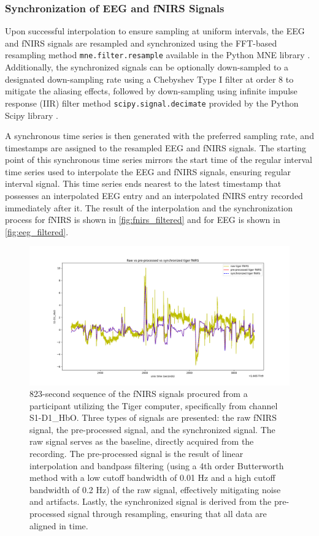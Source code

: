 \subsubsection{Synchronization of EEG and fNIRS Signals}

Upon successful interpolation to ensure sampling at uniform intervals, the EEG and fNIRS signals are resampled and synchronized using the FFT-based resampling method \texttt{mne.filter.resample} available in the Python MNE library \cite{GramfortEtAl2013a}. Additionally, the synchronized signals can be optionally down-sampled to a designated down-sampling rate using a Chebyshev Type I filter at order 8 to mitigate the aliasing effects, followed by down-sampling using infinite impulse response (IIR) filter method \texttt{scipy.signal.decimate} provided by the Python Scipy library \cite{2020SciPy-NMeth}.

A synchronous time series is then generated with the preferred sampling rate, and timestamps are assigned to the resampled EEG and fNIRS signals. The starting point of this synchronous time series mirrors the start time of the regular interval time series used to interpolate the EEG and fNIRS signals, ensuring regular interval signal. This time series ends nearest to the latest timestamp that possesses an interpolated EEG entry and an interpolated fNIRS entry recorded immediately after it. The result of the interpolation and the synchronization process for fNIRS is shown in \autoref{fig:fnirs_filtered} and for EEG is shown in \autoref{fig:eeg_filtered}.

\begin{figure}[h]
  \centering
  \includegraphics[width=\textwidth]{images/fnirs_filtered}
  \caption{823-second sequence of the fNIRS signals procured from a participant utilizing the Tiger computer, specifically from channel S1-D1\_HbO. Three types of signals are presented: the raw fNIRS signal, the pre-processed signal, and the synchronized signal. The raw signal serves as the baseline, directly acquired from the recording. The pre-processed signal is the result of linear interpolation and bandpass filtering (using a 4th order Butterworth method with a low cutoff bandwidth of 0.01 Hz and a high cutoff bandwidth of 0.2 Hz) of the raw signal, effectively mitigating noise and artifacts. Lastly, the synchronized signal is derived from the pre-processed signal through resampling, ensuring that all data are aligned in time.
}
  \label{fig:fnirs_filtered}
\end{figure}

